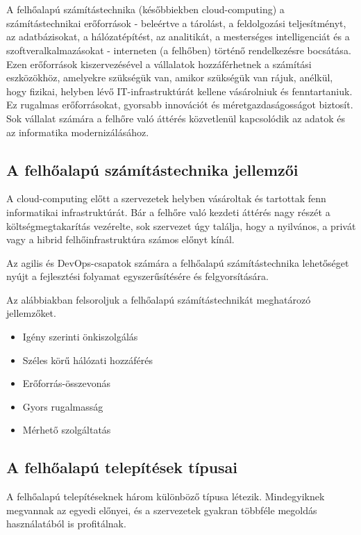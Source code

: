 \chapter{\clouds}
A felhőalapú számítástechnika (későbbiekben cloud-computing) a számítástechnikai erőforrások - beleértve a tárolást, a feldolgozási teljesítményt, az adatbázisokat, a hálózatépítést, az analitikát, a mesterséges intelligenciát és a szoftveralkalmazásokat - interneten (a felhőben) történő rendelkezésre bocsátása. Ezen erőforrások kiszervezésével a vállalatok hozzáférhetnek a számítási eszközökhöz, amelyekre szükségük van, amikor szükségük van rájuk, anélkül, hogy fizikai, helyben lévő IT-infrastruktúrát kellene vásárolniuk és fenntartaniuk. Ez rugalmas erőforrásokat, gyorsabb innovációt és méretgazdaságosságot biztosít. Sok vállalat számára a felhőre való áttérés közvetlenül kapcsolódik az adatok és az informatika modernizálásához.
\cite{cloudComp}

\section{A felhőalapú számítástechnika jellemzői}
A cloud-computing előtt a szervezetek helyben vásároltak és tartottak fenn informatikai infrastruktúrát. Bár a felhőre való kezdeti áttérés nagy részét a költségmegtakarítás vezérelte, sok szervezet úgy találja, hogy a nyilvános, a privát vagy a hibrid felhőinfrastruktúra számos előnyt kínál.  

Az agilis és DevOps-csapatok számára a felhőalapú számítástechnika lehetőséget nyújt a fejlesztési folyamat egyszerűsítésére és felgyorsítására. 

Az alábbiakban felsoroljuk a felhőalapú számítástechnikát meghatározó jellemzőket.
\cite{cloudComp}

\begin{itemize}
    \item Igény szerinti önkiszolgálás
    \item Széles körű hálózati hozzáférés
    \item Erőforrás-összevonás
    \item Gyors rugalmasság
    \item Mérhető szolgáltatás
\end{itemize}

\section{A felhőalapú telepítések típusai}
A felhőalapú telepítéseknek három különböző típusa létezik. Mindegyiknek megvannak az egyedi előnyei, és a szervezetek gyakran többféle megoldás használatából is profitálnak.
\cite{cloudComp}

